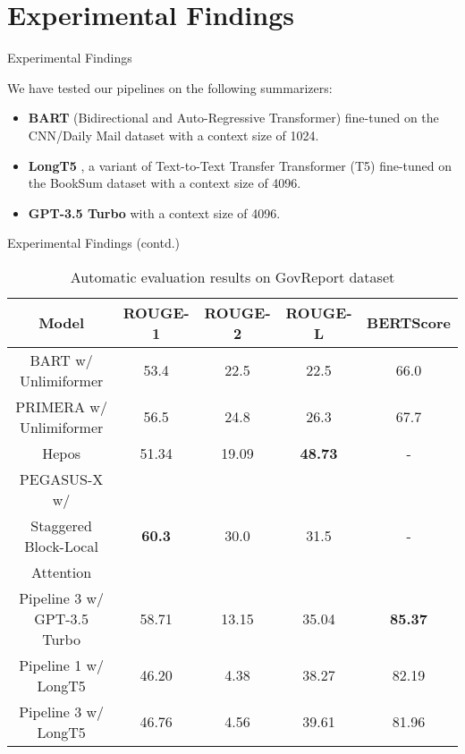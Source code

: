\section{Experimental Findings}

\begin{frame}{Experimental Findings}

	We have tested our pipelines on the following summarizers:
	
	\begin{itemize}
		\item<2-> \textbf{BART} (Bidirectional and Auto-Regressive Transformer)
		\citep{lewis-etal-2020-bart} fine-tuned on the CNN/Daily Mail dataset
		with a context size of 1024.
		\item<3-> \textbf{LongT5} \citep{guo2021longt5}, a variant of Text-to-Text
		Transfer Transformer (T5) \citep{raffel2020exploring} fine-tuned on the
		BookSum dataset with a context size of 4096.
		\item<4> \textbf{GPT-3.5 Turbo} \citep{brown2020language} with a context
		size of 4096.
	\end{itemize}
	
\end{frame}

\begin{frame}{Experimental Findings (contd.)}

	\begin{table}[!ht]
		\centering
		\tiny
	
		\begin{tabular}{c c c c c}
			\hline
			\textbf{Model} & \textbf{ROUGE-1} & \textbf{ROUGE-2} & \textbf{ROUGE-L} &
			\textbf{BERTScore} \\
			\hline
			BART w/ Unlimiformer & 53.4 & 22.5 & 22.5 & 66.0 \\
			PRIMERA w/ Unlimiformer & 56.5 & 24.8 & 26.3 & 67.7 \\
			Hepos & 51.34 & 19.09 & \textbf{48.73} & - \\
			PEGASUS-X w/ & & & & \\
			Staggered Block-Local & \textbf{60.3} & 30.0 & 31.5 & - \\
			Attention & & & & \\
			\hline
			Pipeline 3 w/ GPT-3.5 Turbo & 58.71 & 13.15 & 35.04 & \textbf{85.37} \\
			Pipeline 1 w/ LongT5 & 46.20 & 4.38 & 38.27 & 82.19 \\
			Pipeline 3 w/ LongT5 & 46.76 & 4.56 & 39.61 & 81.96 \\
			\hline
		\end{tabular}
	
		\caption{Automatic evaluation results on GovReport dataset}
		\label{tab:results}
	\end{table}
	
\end{frame}
